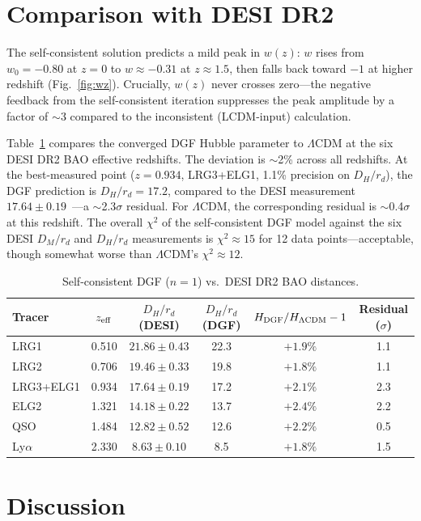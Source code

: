 \documentclass[12pt,a4paper]{article}
\begin{document}
\section*{Comparison with DESI DR2}

The self-consistent solution predicts a mild peak in $w(z)$: $w$ rises from $w_0=-0.80$ at $z=0$ to $w\approx-0.31$ at $z\approx1.5$, then falls back toward $-1$ at higher redshift (Fig.~\ref{fig:wz}). Crucially, $w(z)$ never crosses zero---the negative feedback from the self-consistent iteration suppresses the peak amplitude by a factor of $\sim$3 compared to the inconsistent (LCDM-input) calculation.

Table~\ref{tab:desi} compares the converged DGF Hubble parameter to $\Lambda$CDM at the six DESI DR2 BAO effective redshifts. The deviation is $\sim$2\% across all redshifts. At the best-measured point ($z=0.934$, LRG3+ELG1, 1.1\% precision on $D_H/r_d$), the DGF prediction is $D_H/r_d=17.2$, compared to the DESI measurement $17.64\pm0.19$~\cite{desi2025}---a $\sim$2.3$\sigma$ residual. For $\Lambda$CDM, the corresponding residual is $\sim$0.4$\sigma$ at this redshift. The overall $\chi^2$ of the self-consistent DGF model against the six DESI $D_M/r_d$ and $D_H/r_d$ measurements is $\chi^2\approx15$ for 12 data points---acceptable, though somewhat worse than $\Lambda$CDM's $\chi^2\approx12$.

\begin{table}[htbp]
\centering
\caption{Self-consistent DGF ($n=1$) vs.\ DESI DR2 BAO distances.}
\label{tab:desi}
\begin{tabular}{lccccc}
\toprule
Tracer & $z_{\rm eff}$ & $D_H/r_d$ (DESI) & $D_H/r_d$ (DGF) & $H_{\rm DGF}/H_{\Lambda\rm CDM}-1$ & Residual ($\sigma$) \\
\midrule
LRG1      & 0.510 & $21.86\pm0.43$ & 22.3 & $+1.9\%$ & 1.1 \\
LRG2      & 0.706 & $19.46\pm0.33$ & 19.8 & $+1.8\%$ & 1.1 \\
LRG3+ELG1 & 0.934 & $17.64\pm0.19$ & 17.2 & $+2.1\%$ & 2.3 \\
ELG2      & 1.321 & $14.18\pm0.22$ & 13.7 & $+2.4\%$ & 2.2 \\
QSO       & 1.484 & $12.82\pm0.52$ & 12.6 & $+2.2\%$ & 0.5 \\
Ly$\alpha$ & 2.330 & $8.63\pm0.10$  & 8.5  & $+1.8\%$ & 1.5 \\
\bottomrule
\end{tabular}
\end{table}

\section*{Discussion}
\end{document}
